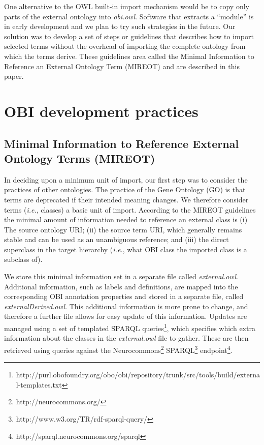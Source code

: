 \documentclass{elsart}       %
\begin{document}
One alternative to the OWL built-in import mechanism would be to copy only parts of the external ontology into \emph{obi.owl}. Software that extracts a ``module''\cite{module} is in early development and we plan to try such strategies in the future. %
Our solution was to develop a set of steps or guidelines that describes how to import selected terms without the overhead of importing the complete ontology from which the terms derive.
These guidelines area called the Minimal Information to Reference an External Ontology Term (MIREOT) and are described in this paper.

\section{OBI development practices}


\subsection{Minimal Information to Reference External Ontology Terms (MIREOT)}

In deciding upon a minimum unit of import, our first step was to consider the practices of other ontologies.
The practice of the Gene Ontology (GO)\cite{go} is that terms are deprecated if their intended meaning changes\cite{deprecated}.
We therefore consider terms (\emph{i.e.}, classes) a basic unit of import.
According to the MIREOT guidelines the minimal amount of information needed to reference an external class is (i) The source ontology URI; (ii) the source term URI, which generally remains stable and can be used as an unambiguous reference; and (iii) the direct superclass in the target hierarchy (\emph{i.e.}, what OBI class the imported class is a subclass of).

We store this minimal information set in a separate file called \emph{external.owl}. 
Additional information, such as labels and definitions, are mapped into the corresponding OBI annotation properties and stored in a separate file, called \emph{externalDerived.owl}. This additional information is more prone to change, and therefore a further file allows for easy update of this information.
Updates are managed using a set of templated SPARQL queries\footnote{http://purl.obofoundry.org/obo/obi/repository/trunk/src/tools/build/external-templates.txt}, which specifies which extra information about the classes in the \emph{external.owl} file to gather.
These are then retrieved using queries against the Neurocommons\footnote{http://neurocommons.org/} SPARQL\footnote{http://www.w3.org/TR/rdf-sparql-query/} endpoint\footnote{http://sparql.neurocommons.org/sparql}.%
\end{document}

